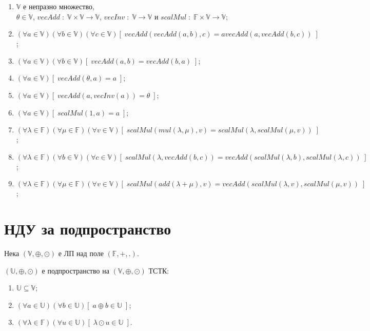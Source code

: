 \documentclass{article}[12pt]
\begin{document}
\begin{enumerate}
\item \(\mathbb{V}\) е непразно множество, \\
\(\theta \in \mathbb{V}\), \(vecAdd \; : \; \mathbb{V} \times \mathbb{V} \to \mathbb{V}\), \(vecInv \; : \; \mathbb{V} \to \mathbb{V}\) и \(scalMul \; : \; \mathbb{F} \times \mathbb{V} \to \mathbb{V}\);
\item \((\forall a \in \mathbb{V})(\forall b \in \mathbb{V})(\forall c \in \mathbb{V})[\; vecAdd(vecAdd(a, b), c) = a vecAdd(a, vecAdd(b, c)) \;]\);
\item \((\forall a \in \mathbb{V})(\forall b \in \mathbb{V})[\; vecAdd(a, b) = vecAdd(b, a) \;]\);
\item \((\forall a \in \mathbb{V})[\; vecAdd(\theta, a) = a \;]\);
\item \((\forall a \in \mathbb{V})[\; vecAdd(a, vecInv(a)) = \theta \;]\);
\item \((\forall a \in \mathbb{V})[\; scalMul(1, a) = a\;]\);
\item \((\forall \lambda \in \mathbb{F})(\forall \mu \in \mathbb{F})(\forall v \in \mathbb{V})[\; scalMul(mul(\lambda, \mu), v) = scalMul(\lambda, scalMul(\mu, v)) \;]\);
\item \((\forall \lambda \in \mathbb{F})(\forall b \in \mathbb{V})(\forall c \in \mathbb{V})[\; scalMul(\lambda, vecAdd(b, c)) = vecAdd(scalMul(\lambda, b), scalMul(\lambda, c)) \;]\);
\item \((\forall \lambda \in \mathbb{F})(\forall \mu \in \mathbb{F})(\forall v \in \mathbb{V})[\; scalMul(add(\lambda + \mu), v) = vecAdd(scalMul(\lambda, v), scalMul(\mu, v)) \;]\);
\end{enumerate}

\section{НДУ за подпространство}

Нека \((\mathbb{V}, \oplus, \odot)\) е ЛП над поле \((\mathbb{F}, +, .)\).

\((\mathbb{U}, \oplus, \odot)\) е подпространство на \((\mathbb{V}, \oplus, \odot)\) ТСТК:

\begin{enumerate}
\item \(\mathbb{U} \subseteq \mathbb{V}\);
\item \((\forall a \in \mathbb{U})(\forall b \in \mathbb{U})[\; a \oplus b \in \mathbb{U}\;]\);
\item \((\forall \lambda \in \mathbb{F})(\forall u \in \mathbb{U})[\; \lambda \odot u \in \mathbb{U}\;]\).
\end{enumerate}
\end{document}
